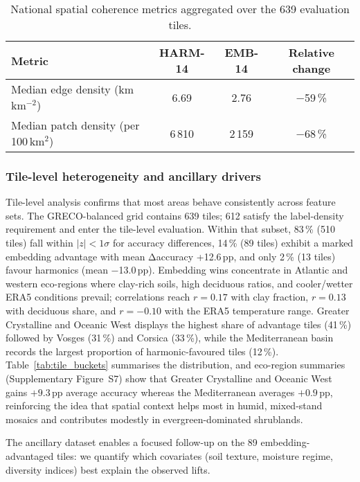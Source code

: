 \documentclass[utf8]{FrontiersinHarvard}
\begin{document}
\begin{table}[H]
    \centering
    \small
    \begin{tabular}{lccc}
        \toprule
        \textbf{Metric} & \textbf{HARM-14} & \textbf{EMB-14} & \textbf{Relative change} \\
        \midrule
        Median edge density (km\,km\(^{-2}\)) & 6.69 & 2.76 & −59\,\% \\
        Median patch density (per 100\,km\(^2\)) & 6\,810 & 2\,159 & −68\,\% \\
        \bottomrule
    \end{tabular}
    \caption{National spatial coherence metrics aggregated over the 639 evaluation tiles.}
    \label{tab:coherence_summary}
\end{table}

\subsubsection{Tile-level heterogeneity and ancillary drivers}

Tile-level analysis confirms that most areas behave consistently across feature sets. The GRECO-balanced grid contains 639 tiles; 612 satisfy the label-density requirement and enter the tile-level evaluation. Within that subset, 83\,\% (510 tiles) fall within \(|z| < 1\sigma\) for accuracy differences, 14\,\% (89 tiles) exhibit a marked embedding advantage with mean Δaccuracy +12.6\,pp, and only 2\,\% (13 tiles) favour harmonics (mean −13.0\,pp). Embedding wins concentrate in Atlantic and western eco-regions where clay-rich soils, high deciduous ratios, and cooler/wetter ERA5 conditions prevail; correlations reach \(r=0.17\) with clay fraction, \(r=0.13\) with deciduous share, and \(r=-0.10\) with the ERA5 temperature range. Greater Crystalline and Oceanic West displays the highest share of advantage tiles (41\,\%) followed by Vosges (31\,\%) and Corsica (33\,\%), while the Mediterranean basin records the largest proportion of harmonic-favoured tiles (12\,\%). Table~\ref{tab:tile_buckets} summarises the distribution, and eco-region summaries (Supplementary Figure~S7) show that Greater Crystalline and Oceanic West gains \(+9.3\)\,pp average accuracy whereas the Mediterranean averages \(+0.9\)\,pp, reinforcing the idea that spatial context helps most in humid, mixed-stand mosaics and contributes modestly in evergreen-dominated shrublands.

The ancillary dataset enables a focused follow-up on the 89 embedding-advantaged tiles: we quantify which covariates (soil texture, moisture regime, diversity indices) best explain the observed lifts.
\end{document}
